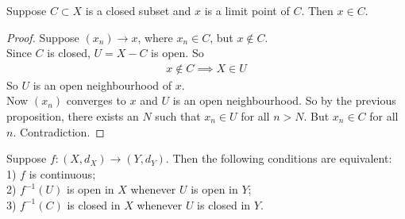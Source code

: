 \documentclass[a4paper]{article}
\begin{document}
\begin{prop}
Suppose $C\subset X$ is a closed subset and $x$ is a limit point of $C$. Then $x \in C$.
\begin{proof}
Suppose $\left(x_n\right) \to x$, where $x_n \in C$, but $x\not\in C$.\\
Since $C$ is closed, $U=X-C$ is open. So
\begin{equation*}
\begin{aligned}
x \not\in C \implies X \in U
\end{aligned}
\end{equation*}
So $U$ is an open neighbourhood of $x$.\\
Now $\left(x_n\right)$ converges to $x$ and $U$ is an open neighbourhood. So by the previous proposition, there exists an $N$ such that $x_n \in U$ for all $n>N$. But $x_n \in C$ for all $n$. Contradiction.
\end{proof}
\end{prop}

\begin{thm}
Suppose $f:\left(X,d_X\right) \to \left(Y,d_Y\right)$. Then the following conditions are equivalent:\\
1) $f$ is continuous;\\
2) $f^{-1}\left(U\right)$ is open in $X$ whenever $U$ is open in $Y$;\\
3) $f^{-1}\left(C\right)$ is closed in $X$ whenever $U$ is closed in $Y$.
\end{thm}
\end{document}

